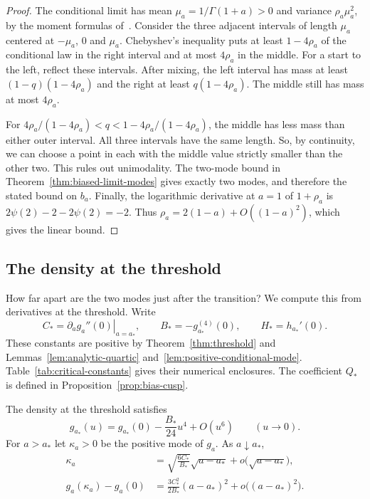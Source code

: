 \begin{proof}
The conditional limit has mean $\mu_a=1/\Gamma(1+a)>0$ and variance
$\rho_a\mu_a^2$, by the moment formulas of~\cite[Theorem~1.4]{glr2026}.
Consider the three adjacent intervals of length $\mu_a$ centered at
$-\mu_a$, $0$ and $\mu_a$. Chebyshev's inequality puts at least
$1-4\rho_a$ of the conditional law in the right interval and at most
$4\rho_a$ in the middle. For a start to the left, reflect these
intervals. After mixing, the left interval has mass at least
$(1-q)(1-4\rho_a)$ and the right at least $q(1-4\rho_a)$.
The middle still has mass at most $4\rho_a$.

For $4\rho_a/(1-4\rho_a)<q<1-4\rho_a/(1-4\rho_a)$, the middle
has less mass than either outer interval. All three intervals have
the same length. So, by continuity, we can choose a point in each
with the middle value strictly smaller than the other two.
This rules out unimodality. The two-mode bound in
Theorem~\ref{thm:biased-limit-modes} gives exactly two modes, and
therefore the stated bound on $b_a$. Finally, the logarithmic derivative at $a=1$
of $1+\rho_a$ is $2\psi(2)-2-2\psi(2)=-2$.
Thus $\rho_a=2(1-a)+O((1-a)^2)$, which gives the linear bound.
\end{proof}

\subsection{The density at the threshold}

How far apart are the two modes just after the transition?
We compute this from derivatives at the threshold. Write
\[
 C_* = \left.\partial_a g_a''(0)\right|_{a=a_*},\qquad
 B_*=-g_{a_*}^{(4)}(0),\qquad H_*=h_{a_*}'(0).
\]
These constants are positive by Theorem~\ref{thm:threshold} and
Lemmas~\ref{lem:analytic-quartic} and~\ref{lem:positive-conditional-mode}.
Table~\ref{tab:critical-constants} gives their numerical enclosures.
The coefficient $Q_*$ is defined in Proposition~\ref{prop:bias-cusp}.



\begin{proposition}\label{prop:critical-shape}
The density at the threshold satisfies
\[
 g_{a_*}(u)=g_{a_*}(0)-\frac{B_*}{24}u^4+O(u^6)
 \qquad(u\to0).
\]
For $a>a_*$ let $\kappa_a>0$ be the positive mode of $g_a$. As $a\downarrow a_*$,
\begin{align*}
 \kappa_a&=\sqrt{\frac{6C_*}{B_*}}\sqrt{a-a_*}
                 +o\bigl(\sqrt{a-a_*}\bigr),\\
 g_a(\kappa_a)-g_a(0)&=\frac{3C_*^2}{2B_*}(a-a_*)^2
                 +o\bigl((a-a_*)^2\bigr).
\end{align*}
\end{proposition}

